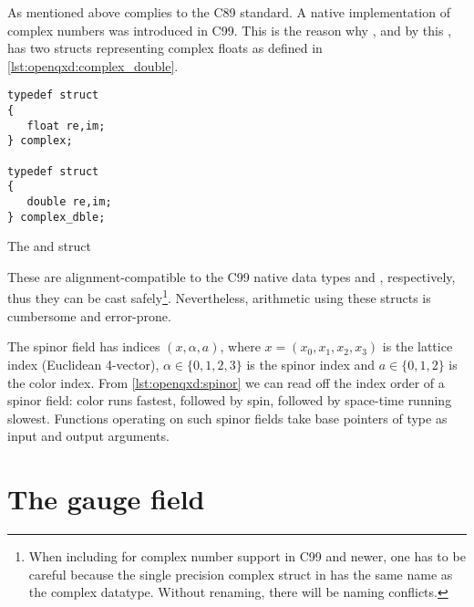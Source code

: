 As mentioned above \openqcd complies to the C89 standard. A native implementation of complex numbers was introduced in C99. This is the reason why \openqcd, and by this \openqxd, has two structs representing complex floats as defined in \cref{lst:openqxd:complex_double}.
\begin{codelisting}
\begin{verbatim}
typedef struct
{
   float re,im;
} complex;

typedef struct
{
   double re,im;
} complex_dble;
\end{verbatim}
\caption{The  and  struct}
\label{lst:openqxd:complex_double}
\end{codelisting}
These are alignment-compatible to the C99 native data types  and , respectively, thus they can be cast safely\footnote{When including  for complex number support in C99 and newer, one has to be careful because the single precision complex struct in \openqxd has the same name as the complex datatype. Without renaming, there will be naming conflicts.}.
Nevertheless, arithmetic using these structs is cumbersome and error-prone. 

The spinor field has indices $(x, \alpha, a)$, where $x=(x_0,x_1,x_2,x_3)$ is the lattice index (Euclidean 4-vector), $\alpha \in \{0,1,2,3\}$ is the spinor index and $a \in \{0,1,2\}$ is the color index.
From \cref{lst:openqxd:spinor} we can read off the index order of a spinor field: color runs fastest, followed by spin, followed by space-time running slowest.
Functions operating on such spinor fields take base pointers of type  as input and output arguments.

\section{The gauge field}
\label{sec:openqxd:gauge_field}

